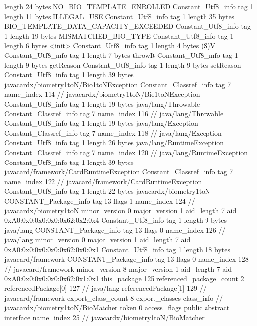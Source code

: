 {{{			length	24
			bytes	NO_BIO_TEMPLATE_ENROLLED
		}
		Constant_Utf8_info {
			tag	1
			length	11
			bytes	ILLEGAL_USE
		}
		Constant_Utf8_info {
			tag	1
			length	35
			bytes	BIO_TEMPLATE_DATA_CAPACITY_EXCEEDED
		}
		Constant_Utf8_info {
			tag	1
			length	19
			bytes	MISMATCHED_BIO_TYPE
		}
		Constant_Utf8_info {
			tag	1
			length	6
			bytes	<init>
		}
		Constant_Utf8_info {
			tag	1
			length	4
			bytes	(S)V
		}
		Constant_Utf8_info {
			tag	1
			length	7
			bytes	throwIt
		}
		Constant_Utf8_info {
			tag	1
			length	9
			bytes	getReason
		}
		Constant_Utf8_info {
			tag	1
			length	9
			bytes	setReason
		}
		Constant_Utf8_info {
			tag	1
			length	39
			bytes	javacardx/biometry1toN/Bio1toNException
		}
		Constant_Classref_info {
			tag	7
			name_index	114		// javacardx/biometry1toN/Bio1toNException
		}
		Constant_Utf8_info {
			tag	1
			length	19
			bytes	java/lang/Throwable
		}
		Constant_Classref_info {
			tag	7
			name_index	116		// java/lang/Throwable
		}
		Constant_Utf8_info {
			tag	1
			length	19
			bytes	java/lang/Exception
		}
		Constant_Classref_info {
			tag	7
			name_index	118		// java/lang/Exception
		}
		Constant_Utf8_info {
			tag	1
			length	26
			bytes	java/lang/RuntimeException
		}
		Constant_Classref_info {
			tag	7
			name_index	120		// java/lang/RuntimeException
		}
		Constant_Utf8_info {
			tag	1
			length	39
			bytes	javacard/framework/CardRuntimeException
		}
		Constant_Classref_info {
			tag	7
			name_index	122		// javacard/framework/CardRuntimeException
		}
		Constant_Utf8_info {
			tag	1
			length	22
			bytes	javacardx/biometry1toN
		}
		CONSTANT_Package_info {
			tag	13
			flags	1
			name_index	124		// javacardx/biometry1toN
			minor_version	0
			major_version	1
			aid_length	7
			aid	0xA0:0x0:0x0:0x0:0x62:0x2:0x4
		}
		Constant_Utf8_info {
			tag	1
			length	9
			bytes	java/lang
		}
		CONSTANT_Package_info {
			tag	13
			flags	0
			name_index	126		// java/lang
			minor_version	0
			major_version	1
			aid_length	7
			aid	0xA0:0x0:0x0:0x0:0x62:0x0:0x1
		}
		Constant_Utf8_info {
			tag	1
			length	18
			bytes	javacard/framework
		}
		CONSTANT_Package_info {
			tag	13
			flags	0
			name_index	128		// javacard/framework
			minor_version	8
			major_version	1
			aid_length	7
			aid	0xA0:0x0:0x0:0x0:0x62:0x1:0x1
		}
	}
	this_package	125
	referenced_package_count	2
	referencedPackage[0]	127		// java/lang
	referencedPackage[1]	129		// javacard/framework
	export_class_count	8
	export_classes {
		class_info {		// javacardx/biometry1toN/BioMatcher
			token	0
			access_flags	public abstract interface
			name_index	25		// javacardx/biometry1toN/BioMatcher
}}}
